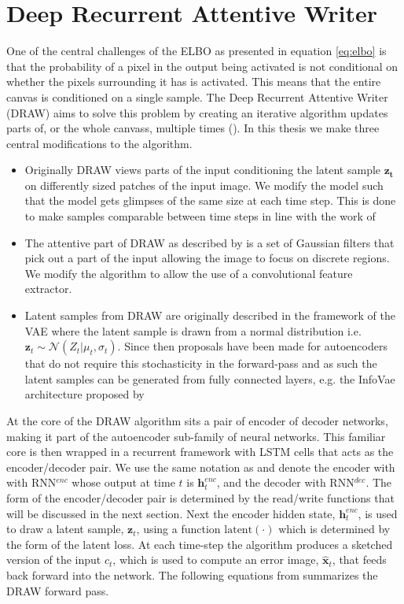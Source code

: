 \section{Deep Recurrent Attentive Writer}\label{sec:draw}

One of the central challenges of the ELBO as presented in equation \ref{eq:elbo} is that the probability of a pixel in the output being activated is not conditional on whether the pixels surrounding it has is activated. This means that the entire canvas is conditioned on a single sample. The Deep Recurrent Attentive Writer (DRAW) aims to solve this problem by creating an iterative algorithm updates parts of, or the whole canvass, multiple times (\cite{Gregor2015}). In this thesis we make three central modifications to the algorithm. 

\begin{itemize}
\item Originally DRAW views parts of the input conditioning the latent sample $\mathbf{z_t}$ on differently sized patches of the input image. We modify the model such that the model gets glimpses of the same size at each time step. This is done to make samples comparable between time steps in line with the work of \citet{Harris2019}
\item The attentive part of DRAW as described by \citet{Gregor2015} is a set of Gaussian filters that pick out a part of the input allowing the image to focus on discrete regions. We modify the algorithm to allow the use of a convolutional feature extractor.
\item Latent samples from DRAW are originally described in the framework of the VAE where the latent sample is drawn from a normal distribution i.e. $\mathbf{z}_t \sim \mathcal{N}(Z_t|\mu_t, \sigma_t)$. Since then proposals have been made for autoencoders that do not require this stochasticity in the forward-pass and as such the latent samples can be generated from fully connected layers, e.g. the InfoVae architecture proposed by \citet{Zhao}
\end{itemize}

\noindent At the core of the DRAW algorithm sits a pair of encoder of decoder networks, making it part of the autoencoder sub-family of neural networks. This familiar core is then wrapped in a recurrent framework with LSTM cells that acts as the encoder/decoder pair. We use the same notation as \citet{Gregor2015} and denote the encoder with with RNN${}^{enc}$ whose output at time $t$ is $\mathbf{h}_t^{enc}$, and the decoder with RNN${}^{dec}$. The form of the encoder/decoder pair is determined by the read/write functions that will be discussed in the next section. Next the encoder hidden state, $\mathbf{h}_t^{enc}$, is used to draw a latent sample, $\mathbf{z}_t$, using a function $\text{latent}(\cdot)$ which is determined by the form of the latent loss. At each time-step the algorithm produces a sketched version of the input $c_t$, which is used to compute an error image, $\hat{\mathbf{x}}_t$, that feeds back forward into the network. The following equations from \citet{Gregor2015} summarizes the DRAW forward pass.

